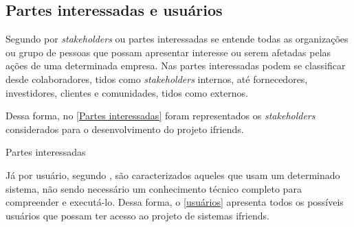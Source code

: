 \subsection{Partes interessadas e usuários}
Segundo  por \textit{stakeholders} ou partes interessadas se entende todas as organizações ou grupo de pessoas que possam apresentar interesse ou serem afetadas pelas ações de uma determinada empresa. Nas partes interessadas podem se classificar desde colaboradores, tidos como \textit{stakeholders} internos, até fornecedores, investidores, clientes e comunidades, tidos como externos. 

Dessa forma, no \autoref{Partes interessadas} foram representados os \textit{stakeholders} considerados para o desenvolvimento do projeto \gls{ifriends}.

\def\arraystretch{2}
\begin{quadro}[htb]
\centering
\ABNTEXfontereduzida
\caption{Partes interessadas}
\label{Partes interessadas}
\end{quadro}
\FloatBarrier 

Já por usuário, segundo , são caracterizados aqueles que usam um determinado sistema, não sendo necessário um conhecimento técnico completo para compreender e executá-lo. Dessa forma, o \autoref{usuários} apresenta todos os possíveis usuários que possam ter acesso ao projeto de sistemas \gls{ifriends}.

